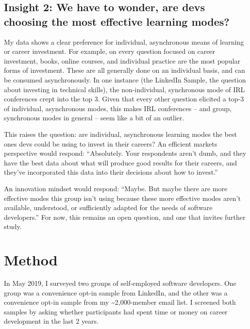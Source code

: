 \documentclass[13pt,]{tufte-handout}
\begin{document}
\hypertarget{insight-2-we-have-to-wonder-are-devs-choosing-the-most-effective-learning-modes}{%
\subsection{Insight 2: We have to wonder, are devs choosing the most
effective learning
modes?}\label{insight-2-we-have-to-wonder-are-devs-choosing-the-most-effective-learning-modes}}

My data shows a clear preference for individual, asynchronous means of
learning or career investment. For example, on every question focused on
career investment, books, online courses, and individual practice are
the most popular forms of investment. These are all generally done on an
individual basis, and can be consumed asynchronously. In one instance
(the LinkedIn Sample, the question about investing in technical skills),
the non-individual, synchronous mode of IRL conferences crept into the
top 3. Given that every other question elicited a top-3 of individual,
asynchronous modes, this makes IRL conferences -- and group, synchronous
modes in general -- seem like a bit of an outlier.

This raises the question: are individual, asynchronous learning modes
the best ones devs could be using to invest in their careers? An
efficient markets perspective would respond: ``Absolutely. Your
respondents aren't dumb, and they have the best data about what will
produce good results for their careers, and they've incorporated this
data into their decisions about how to invest.''

An innovation mindset would respond: ``Maybe. But maybe there are more
effective modes this group isn't using because these more effective
modes aren't available, understood, or sufficiently adapted for the
needs of software developers.'' For now, this remains an open question,
and one that invites further study.

\hypertarget{method}{%
\section{Method}\label{method}}

In May 2019, I surveyed two groups of self-employed software developers.
One group was a convenience opt-in sample from LinkedIn, and the other
was a convenience opt-in sample from my \textasciitilde{}2,000-member
email list. I screened both samples by asking whether participants had
spent time or money on career development in the last 2 years.
\end{document}
